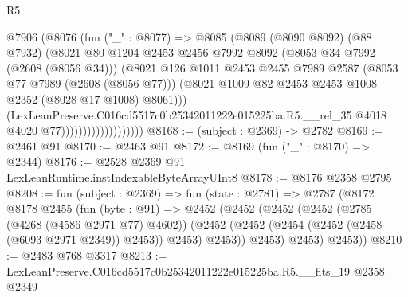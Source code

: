 \begin{lexlean}{R5}
\begin{coremodule}
                                @7906
                                  (@8076
                                    (fun ("_" : @8077) =>
                                    @8085
                                      (@8089
                                        (@8090 @8092)
                                        (@88 @7932)
                                        (@8021
                                          @80
                                          @1204
                                          @2453
                                          @2456
                                          @7992
                                          @8092
                                          (@8053 @34 @7992 (@2608 (@8056 @34)))
                                          (@8021
                                            @126
                                            @1011
                                            @2453
                                            @2455
                                            @7989
                                            @2587
                                            (@8053 @77 @7989 (@2608 (@8056 @77)))
                                            (@8021
                                              @1009
                                              @82
                                              @2453
                                              @2453
                                              @1008
                                              @2352
                                              (@8028 @17 @1008)
                                              @8061)))
                                        (LexLeanPreserve.C016cd5517c0b25342011222e015225ba.R5.__rel_35
                                          @4018
                                          @4020
                                          @77)))))))))))))))))))
@8168 := (subject : @2369) -> @2782
@8169 := @2461 @91
@8170 := @2463 @91
@8172 := @8169 (fun ("_" : @8170) => @2344)
@8176 := @2528 @2369 @91 LexLeanRuntime.instIndexableByteArrayUInt8
@8178 := @8176 @2358 @2795
@8208 := fun (subject : @2369) =>
  fun (state : @2781) =>
  @2787
    (@8172
      @8178
      @2455
      (fun (byte : @91) =>
      @2452
        (@2452
          (@2452
            (@2452
              (@2785 (@4268 (@4586 @2971 @77) @4602))
              (@2452 (@2452 (@2454 (@2452 (@2458 (@6093 @2971 @2349)) @2453)) @2453) @2453))
            @2453)
          @2453)
        @2453))
@8210 := @2483 @768 @3317
@8213 := LexLeanPreserve.C016cd5517c0b25342011222e015225ba.R5.__fits_19 @2358 @2349

\end{coremodule}
\end{lexlean}
